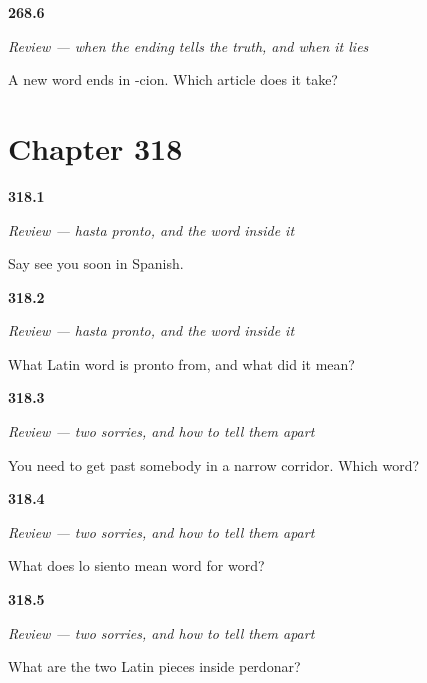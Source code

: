 \noindent\begin{minipage}[t]{\linewidth}
\raggedright
\hypertarget{review-ES-C268-repaso-dos-finales-dos-generos-cion}{\textbf{268.6}} \emph{Review — when the ending tells the truth, and when it lies}\par
\small A new word ends in -cion. Which article does it take?
\end{minipage}\par\medskip

\section*{Chapter 318}

\noindent\begin{minipage}[t]{\linewidth}
\raggedright
\hypertarget{review-ES-C318-repaso-despedirse-soon}{\textbf{318.1}} \emph{Review — hasta pronto, and the word inside it}\par
\small Say see you soon in Spanish.
\end{minipage}\par\medskip

\noindent\begin{minipage}[t]{\linewidth}
\raggedright
\hypertarget{review-ES-C318-repaso-despedirse-latin}{\textbf{318.2}} \emph{Review — hasta pronto, and the word inside it}\par
\small What Latin word is pronto from, and what did it mean?
\end{minipage}\par\medskip

\noindent\begin{minipage}[t]{\linewidth}
\raggedright
\hypertarget{review-ES-C318-repaso-disculparse-corridor}{\textbf{318.3}} \emph{Review — two sorries, and how to tell them apart}\par
\small You need to get past somebody in a narrow corridor. Which word?
\end{minipage}\par\medskip

\noindent\begin{minipage}[t]{\linewidth}
\raggedright
\hypertarget{review-ES-C318-repaso-disculparse-literal}{\textbf{318.4}} \emph{Review — two sorries, and how to tell them apart}\par
\small What does lo siento mean word for word?
\end{minipage}\par\medskip

\noindent\begin{minipage}[t]{\linewidth}
\raggedright
\hypertarget{review-ES-C318-repaso-disculparse-donare}{\textbf{318.5}} \emph{Review — two sorries, and how to tell them apart}\par
\small What are the two Latin pieces inside perdonar?
\end{minipage}\par\medskip

